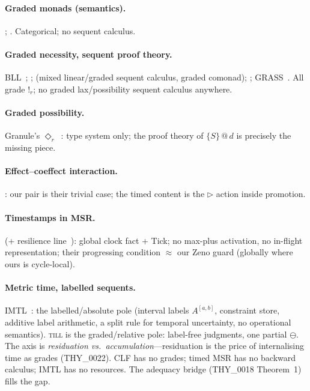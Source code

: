 \documentclass[11pt]{article}
\makeatletter
\newcommand{\lax}[2]{\{#1\}\mathbin{@}#2}       %
\newcommand{\gbang}[1]{{!}_{#1}}                 %
\newcommand{\act}{\mathbin{\rhd}}                %
\newcommand{\res}{\mathbin{\ominus}}             %
\newcommand{\till}{\textsc{till}}                %
\theoremstyle{definition}
\theoremstyle{remark}
\makeatother
\begin{document}
\paragraph{Graded monads (semantics).}
\cite{Katsumata2014}; \cite{FujiiKatsumataMillies2016}.
Categorical; no sequent calculus.

\paragraph{Graded necessity, sequent proof theory.}
BLL~\cite{GirardScedrovScott1992};
\cite{MoonEadesOrchard2021};
\cite{VollmerMarshallEadesOrchard2025} (mixed linear/graded sequent calculus,
graded comonad);
\cite{HanukaevEades2025};
GRASS~\cite{GRASS2026}.
All grade $\gbang{r}$; no graded lax/possibility sequent calculus anywhere.

\paragraph{Graded possibility.}
Granule's $\Diamond_r$~\cite{OrchardLiepeltEades2019}: type system only; the
proof theory of $\lax{S}{d}$ is precisely the missing piece.

\paragraph{Effect--coeffect interaction.}
\cite{GaboardiICFP2016}: our pair is their trivial case; the timed content is the
$\act$ action inside promotion.

\paragraph{Timestamps in MSR.}
\cite{KanovichFORMATS2016} (+ resilience line~\cite{KanovichResilient2024}):
global clock fact + Tick; no max-plus activation, no in-flight representation;
their progressing condition $\approx$ our Zeno guard (globally where ours is
cycle-local).

\paragraph{Metric time, labelled sequents.}
IMTL~\cite{deSaToninhoPfenning2023}: the labelled/absolute pole (interval labels
$A^{[a,b]}$, constraint store, additive label arithmetic, a split rule for
temporal uncertainty, no operational semantics).  \till{} is the graded/relative
pole: label-free judgments, one partial $\res$.  The axis is \emph{residuation
vs.\ accumulation}---residuation is the price of internalising time as grades
(THY\_0022).  CLF has no grades; timed MSR has no backward calculus; IMTL has no
resources.  The adequacy bridge (THY\_0018 Theorem~1) fills the gap.
\end{document}
